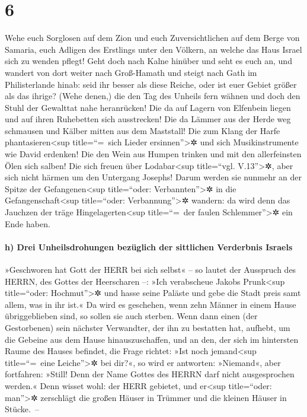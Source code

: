 \hypertarget{section-5}{%
\section{6}\label{section-5}}

Wehe euch Sorglosen auf dem Zion und euch Zuversichtlichen
auf dem Berge von Samaria, euch Adligen des Erstlings unter den Völkern,
an welche das Haus Israel sich zu wenden pflegt! Geht doch
nach Kalne hinüber und seht es euch an, und wandert von dort weiter nach
Groß-Hamath und steigt nach Gath im Philisterlande hinab: seid ihr
besser als diese Reiche, oder ist euer Gebiet größer als das ihrige?
(Wehe denen,) die den Tag des Unheils fern wähnen und doch
den Stuhl der Gewalttat nahe heranrücken! Die da auf
Lagern von Elfenbein liegen und auf ihren Ruhebetten sich ausstrecken!
Die da Lämmer aus der Herde weg schmausen und Kälber mitten aus dem
Maststall! Die zum Klang der Harfe
phantasieren\textless sup title=``=~sich Lieder ersinnen''\textgreater✲
und sich Musikinstrumente wie David erdenken! Die den Wein
aus Humpen trinken und mit den allerfeinsten Ölen sich salben! Die sich
freuen über Lodabar\textless sup title=``vgl. V.13''\textgreater✲, aber
sich nicht härmen um den Untergang Josephs! Darum werden
sie nunmehr an der Spitze der Gefangenen\textless sup title=``oder:
Verbannten''\textgreater✲ in die Gefangenschaft\textless sup
title=``oder: Verbannung''\textgreater✲ wandern: da wird denn das
Jauchzen der träge Hingelagerten\textless sup title=``=~der faulen
Schlemmer''\textgreater✲ ein Ende haben.

\hypertarget{h-drei-unheilsdrohungen-bezuxfcglich-der-sittlichen-verderbnis-israels}{%
\paragraph{h) Drei Unheilsdrohungen bezüglich der sittlichen Verderbnis
Israels}\label{h-drei-unheilsdrohungen-bezuxfcglich-der-sittlichen-verderbnis-israels}}

»Geschworen hat Gott der HERR bei sich selbst« -- so
lautet der Ausspruch des HERRN, des Gottes der Heerscharen --: »Ich
verabscheue Jakobs Prunk\textless sup title=``oder:
Hochmut''\textgreater✲ und hasse seine Paläste und gebe die Stadt preis
samt allem, was in ihr ist.« Da wird es geschehen, wenn
zehn Männer in einem Hause übriggeblieben sind, so sollen sie auch
sterben. Wenn dann einen (der Gestorbenen) sein nächster
Verwandter, der ihn zu bestatten hat, aufhebt, um die Gebeine aus dem
Hause hinauszuschaffen, und an den, der sich im hintersten Raume des
Hauses befindet, die Frage richtet: »Ist noch jemand\textless sup
title=``=~eine Leiche''\textgreater✲ bei dir?«, so wird er antworten:
»Niemand«, aber fortfahren: »Still! Denn der Name Gottes des HERRN darf
nicht ausgesprochen werden.« Denn wisset wohl: der HERR
gebietet, und er\textless sup title=``oder: man''\textgreater✲
zerschlägt die großen Häuser in Trümmer und die kleinen Häuser in
Stücke.~--

